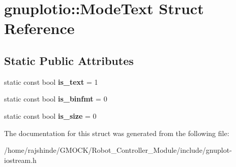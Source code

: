 \hypertarget{structgnuplotio_1_1_mode_text}{}\section{gnuplotio\+:\+:Mode\+Text Struct Reference}
\label{structgnuplotio_1_1_mode_text}
\subsection*{Static Public Attributes}
\begin{DoxyCompactItemize}
\item 
static const bool {\bfseries is\+\_\+text} = 1\hypertarget{structgnuplotio_1_1_mode_text_a7083d8977c354a036a7c542bf99d3d52}{}\label{structgnuplotio_1_1_mode_text_a7083d8977c354a036a7c542bf99d3d52}

\item 
static const bool {\bfseries is\+\_\+binfmt} = 0\hypertarget{structgnuplotio_1_1_mode_text_a4c771363d894ae64d6af961ffde35126}{}\label{structgnuplotio_1_1_mode_text_a4c771363d894ae64d6af961ffde35126}

\item 
static const bool {\bfseries is\+\_\+size} = 0\hypertarget{structgnuplotio_1_1_mode_text_aaffc1e7bb26c6d1404cb5a3f03f13be9}{}\label{structgnuplotio_1_1_mode_text_aaffc1e7bb26c6d1404cb5a3f03f13be9}

\end{DoxyCompactItemize}


The documentation for this struct was generated from the following file\+:\begin{DoxyCompactItemize}
\item 
/home/rajshinde/\+G\+M\+O\+C\+K/\+Robot\+\_\+\+Controller\+\_\+\+Module/include/gnuplot-\/iostream.\+h\end{DoxyCompactItemize}
